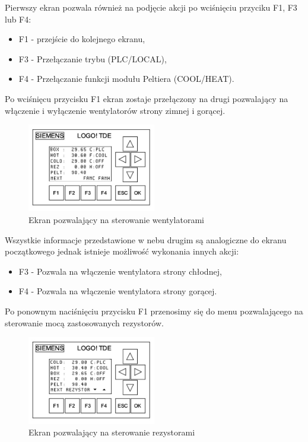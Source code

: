 \documentclass[oneside]{mgr}
\begin{document}
Pierwszy ekran pozwala również na podjęcie akcji po wciśnięciu przyciku F1, F3 lub F4:
\begin{itemize}
    \item F1 - przejście do kolejnego ekranu,
    \item F3 - Przełączanie trybu (PLC/LOCAL),
    \item F4 - Przełączanie funkcji modułu Peltiera (COOL/HEAT).
\end{itemize}
Po wciśnięcu przycisku F1 ekran zostaje przełączony na drugi pozwalający na włączenie i wyłączenie wentylatorów strony zimnej i gorącej.
\begin{center}
\begin{figure}[h!]
    \centering
    \includegraphics[width=0.5\textwidth]{Ekran2.jpg}
    \caption{Ekran pozwalający na sterowanie wentylatorami}
    \end{figure}
\end{center}
Wszystkie informacje przedstawione w nebu drugim są analogiczne do ekranu początkowego jednak istnieje możliwość wykonania innych akcji:
\begin{itemize}
    \item F3 - Pozwala na włączenie wentylatora strony chłodnej,
    \item F4 - Pozwala na włączenie wentylatora strony gorącej.
\end{itemize}
Po ponownym naciśnięciu przycisku F1 przenosimy się do menu pozwalającego na sterowanie mocą zastosowanych rezystorów.
\begin{center}
\begin{figure}[h!]
    \centering
    \includegraphics[width=0.5\textwidth]{Ekran3.jpg}
    \caption{Ekran pozwalający na sterowanie rezystorami}
    \end{figure}
\end{center}
\end{document}
